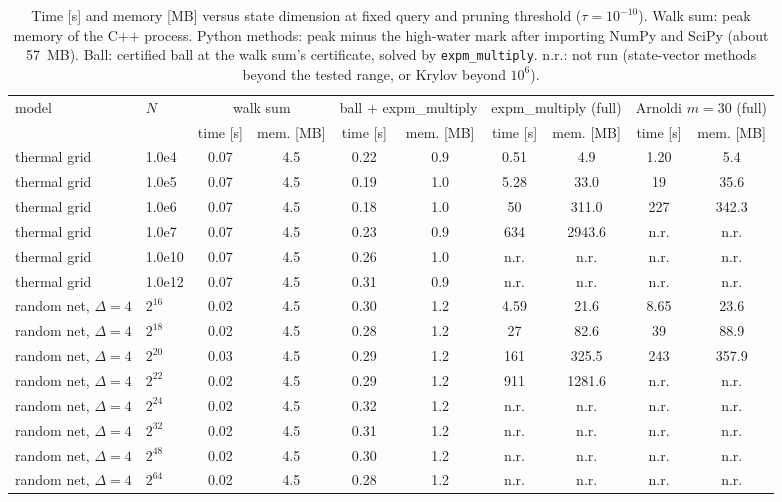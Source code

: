 \begin{table}[t]
\footnotesize\setlength{\tabcolsep}{4pt}
\caption{Time [s] and memory [MB] versus state dimension at fixed query and pruning threshold ($\tau=10^{-10}$). Walk sum: peak memory of the C++ process. Python methods: peak minus the high-water mark after importing NumPy and SciPy (about 57~MB). Ball: certified ball at the walk sum's certificate, solved by \texttt{expm\_multiply}. n.r.: not run (state-vector methods beyond the tested range, or Krylov beyond $10^6$).}\label{tab:scaling}
\begin{ruledtabular}
\begin{tabular}{ll|cc|cc|cc|cc}
model & $N$ & \multicolumn{2}{c|}{walk sum} & \multicolumn{2}{c|}{ball + expm\_multiply} & \multicolumn{2}{c|}{expm\_multiply (full)} & \multicolumn{2}{c}{Arnoldi $m=30$ (full)}\\
 & & time [s] & mem. [MB] & time [s] & mem. [MB] & time [s] & mem. [MB] & time [s] & mem. [MB]\\\hline
thermal grid & 1.0e4 & 0.07 & 4.5 & 0.22 & 0.9 & 0.51 & 4.9 & 1.20 & 5.4 \\
thermal grid & 1.0e5 & 0.07 & 4.5 & 0.19 & 1.0 & 5.28 & 33.0 & 19 & 35.6 \\
thermal grid & 1.0e6 & 0.07 & 4.5 & 0.18 & 1.0 & 50 & 311.0 & 227 & 342.3 \\
thermal grid & 1.0e7 & 0.07 & 4.5 & 0.23 & 0.9 & 634 & 2943.6 & n.r. & n.r. \\
thermal grid & 1.0e10 & 0.07 & 4.5 & 0.26 & 1.0 & n.r. & n.r. & n.r. & n.r. \\
thermal grid & 1.0e12 & 0.07 & 4.5 & 0.31 & 0.9 & n.r. & n.r. & n.r. & n.r. \\
random net, $\Delta=4$ & $2^{16}$ & 0.02 & 4.5 & 0.30 & 1.2 & 4.59 & 21.6 & 8.65 & 23.6 \\
random net, $\Delta=4$ & $2^{18}$ & 0.02 & 4.5 & 0.28 & 1.2 & 27 & 82.6 & 39 & 88.9 \\
random net, $\Delta=4$ & $2^{20}$ & 0.03 & 4.5 & 0.29 & 1.2 & 161 & 325.5 & 243 & 357.9 \\
random net, $\Delta=4$ & $2^{22}$ & 0.02 & 4.5 & 0.29 & 1.2 & 911 & 1281.6 & n.r. & n.r. \\
random net, $\Delta=4$ & $2^{24}$ & 0.02 & 4.5 & 0.32 & 1.2 & n.r. & n.r. & n.r. & n.r. \\
random net, $\Delta=4$ & $2^{32}$ & 0.02 & 4.5 & 0.31 & 1.2 & n.r. & n.r. & n.r. & n.r. \\
random net, $\Delta=4$ & $2^{48}$ & 0.02 & 4.5 & 0.30 & 1.2 & n.r. & n.r. & n.r. & n.r. \\
random net, $\Delta=4$ & $2^{64}$ & 0.02 & 4.5 & 0.28 & 1.2 & n.r. & n.r. & n.r. & n.r. \\
\end{tabular}
\end{ruledtabular}
\end{table}
